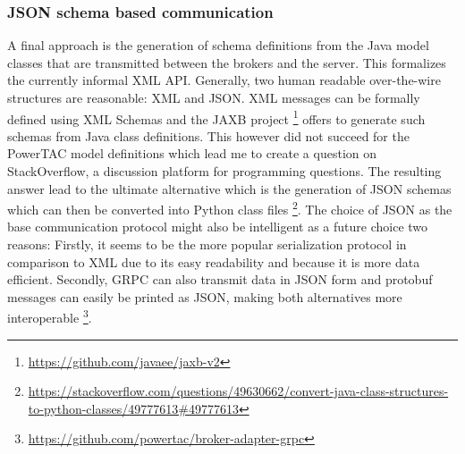 \subsubsection{JSON schema based communication}%
\label{sub:json_schema_based_communication}


A final approach is the generation of schema definitions from the Java model classes that are transmitted between the
brokers and the server. This formalizes the currently informal \ac {XML} \ac{API}. Generally, two human readable over-the-wire structures are reasonable: \ac {XML} and \ac{JSON}.
\ac {XML} messages can be formally defined using \ac {XML} Schemas and the \ac{JAXB} project
\footnote{\url{https://github.com/javaee/jaxb-v2}} offers to generate such schemas from Java class definitions. This
however did not succeed for the \ac {PowerTAC} model definitions which lead me to create a question on StackOverflow, a
discussion platform for programming questions. The resulting answer lead to the ultimate alternative which is the
generation of \ac {JSON} schemas which can then be converted into Python class files
\footnote{\url{https://stackoverflow.com/questions/49630662/convert-java-class-structures-to-python-classes/49777613\#49777613}}.
The choice of \ac {JSON} as the base communication protocol might also be intelligent as a future choice two reasons:
Firstly, it seems to be the more popular serialization protocol in comparison to \ac {XML} \citep{jsonxml} due to its
easy readability and because it is more data efficient. Secondly, \ac {GRPC} can also transmit data in \ac {JSON} form
and protobuf messages can easily be printed as \ac {JSON}, making both alternatives more interoperable
\footnote{\url{https://github.com/powertac/broker-adapter-grpc} }.


